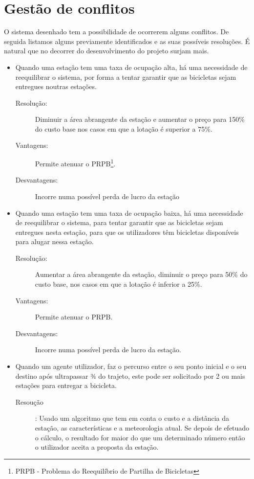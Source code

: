 \section{Gestão de conflitos}\label{sec:gestao_de_conflitos}

 O sistema desenhado tem a possibilidade de ocorrerem alguns conflitos. De seguida listamos alguns previamente identificados e as suas possíveis resoluções. É natural que no decorrer do desenvolvimento do projeto surjam mais.
 
\begin{itemize}
  \item Quando uma estação tem uma taxa de ocupação alta, há uma necessidade de reequilibrar o sistema, por forma a tentar garantir que as bicicletas sejam entregues noutras estações.
		\begin{description}
			\item[Resolução:] Diminuir a área abrangente da estação e aumentar o preço para 150\% do custo base nos casos em que a lotação é superior a 75\%.
			\item[Vantagens:] Permite atenuar o PRPB\footnote{PRPB - Problema do Reequilíbrio de Partilha de Bicicletas}.
			\item[Desvantagens:] Incorre numa possível perda de lucro da estação
		\end{description}
\vspace{5mm}
  \item Quando uma estação tem uma taxa de ocupação baixa, há uma necessidade de reequilibrar o sistema, para tentar garantir que as bicicletas sejam entregues nesta estação, para que os utilizadores têm bicicletas disponíveis para alugar nessa estação.
		\begin{description}
			\item[Resolução:] Aumentar a área abrangente da estação, diminuir o preço para 50\% do custo base, nos casos em que a lotação é inferior a 25\%.
			\item[Vantagens:] Permite atenuar o PRPB.
			\item[Desvantagens:] Incorre numa possível perda de lucro da estação.
		\end{description}
\vspace{5mm}
  \item  Quando um agente utilizador, faz o percurso entre o seu ponto inicial e o seu destino após ultrapassar ¾ do trajeto, este pode ser solicitado por 2 ou mais estações para entregar a bicicleta.
		\begin{description}
			\item[Resoução]: Usado um algoritmo que tem em conta o custo e a distância da estação, as características e a meteorologia atual. Se depois de efetuado o cálculo, o resultado for maior do que um determinado número então o utilizador aceita a proposta da estação.

\end{description}
\end{itemize}
